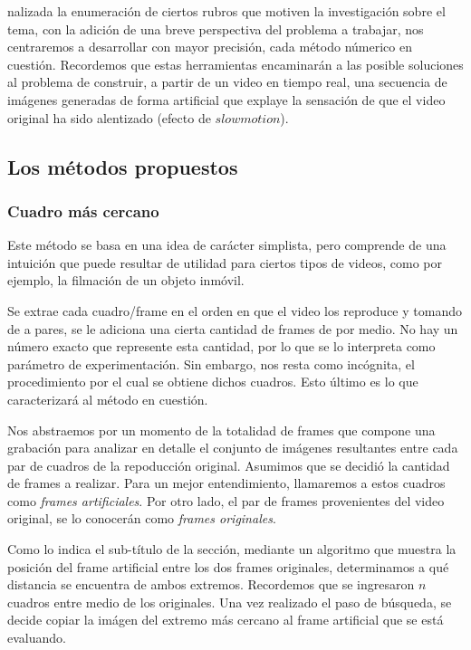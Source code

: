 \par {}nalizada la enumeraci\'on de ciertos rubros que motiven la investigaci\'on sobre el tema, con la adici\'on de una breve perspectiva del problema a trabajar, nos centraremos a desarrollar con mayor precisi\'on, cada m\'etodo n\'umerico en cuesti\'on. Recordemos que estas herramientas encaminar\'an a las posible soluciones al problema de construir, a partir de un video en tiempo real, una secuencia de im\'agenes generadas de forma artificial que explaye la sensaci\'on de que el video original ha sido alentizado (efecto de $slowmotion$).

\subsection{Los m\'etodos propuestos}

\subsubsection{Cuadro m\'as cercano}

Este m\'etodo se basa en una idea de car\'acter simplista, pero comprende de una intuici\'on que puede resultar de utilidad para ciertos tipos de videos, como por ejemplo, la filmaci\'on de un objeto inm\'ovil.

Se extrae cada cuadro/frame en el orden en que el video los reproduce y tomando de a pares, se le adiciona una cierta cantidad de frames de por medio. No hay un n\'umero exacto que represente esta cantidad, por lo que se lo interpreta como par\'ametro de experimentaci\'on. Sin embargo, nos resta como inc\'ognita, el procedimiento por el cual se obtiene dichos cuadros. Esto \'ultimo es lo que caracterizar\'a al m\'etodo en cuesti\'on.

Nos abstraemos por un momento de la totalidad de frames que compone una grabaci\'on para analizar en detalle el conjunto de im\'agenes resultantes entre cada par de cuadros de la repoducci\'on original. Asumimos que se decidi\'o la cantidad de frames a realizar. Para un mejor entendimiento, llamaremos a estos cuadros como \textit{frames artificiales}. Por otro lado, el par de frames provenientes del video original, se lo conocer\'an como \textit{frames originales}.

Como lo indica el sub-t\'itulo de la secci\'on, mediante un algoritmo que muestra la posici\'on del frame artificial entre los dos frames originales, determinamos a qu\'e distancia se encuentra de ambos extremos. Recordemos que se ingresaron $n$ cuadros entre medio de los originales. Una vez realizado el paso de b\'usqueda, se decide copiar la im\'agen del extremo m\'as cercano al frame artificial que se est\'a evaluando. 

